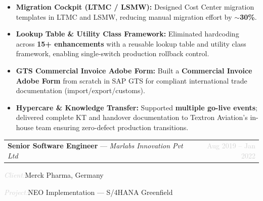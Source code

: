 \documentclass[10pt, a4paper]{article}
\makeatletter
\newcommand{\cventry}[3]{%
  \noindent
  \begin{tabularx}{\linewidth}{@{}X r@{}}
    \textbf{#1} --- \textit{#2} & \textcolor{lightgray}{\small #3}
  \end{tabularx}
  \vspace{2pt}
}
\newcommand{\clientinfo}[2]{%
  \noindent\textcolor{lightgray}{\small\textit{#1:}}\enspace#2\par
}
\makeatother
\begin{document}
\begin{itemize}
  \item \textbf{Migration Cockpit (LTMC / LSMW):}
        Designed Cost Center migration templates in LTMC and LSMW, reducing manual
        migration effort by \textbf{$\sim$30\%}.

  \item \textbf{Lookup Table \& Utility Class Framework:}
        Eliminated hardcoding across \textbf{15+ enhancements} with a reusable
        lookup table and utility class framework, enabling single-switch
        production rollback control.

  \item \textbf{GTS Commercial Invoice Adobe Form:}
        Built a \textbf{Commercial Invoice Adobe Form} from scratch in SAP GTS
        for compliant international trade documentation (import/export/customs).

  \item \textbf{Hypercare \& Knowledge Transfer:}
        Supported \textbf{multiple go-live events}; delivered complete KT and
        handover documentation to Textron Aviation's in-house team ensuring
        zero-defect production transitions.
\end{itemize}

\vspace{4pt}

\cventry{Senior Software Engineer}{Marlabs Innovation Pvt Ltd}{Aug 2019 -- Jan 2022}
\clientinfo{Client}{Merck Pharma, Germany}
\clientinfo{Project}{NEO Implementation --- S/4HANA Greenfield}
\end{document}
